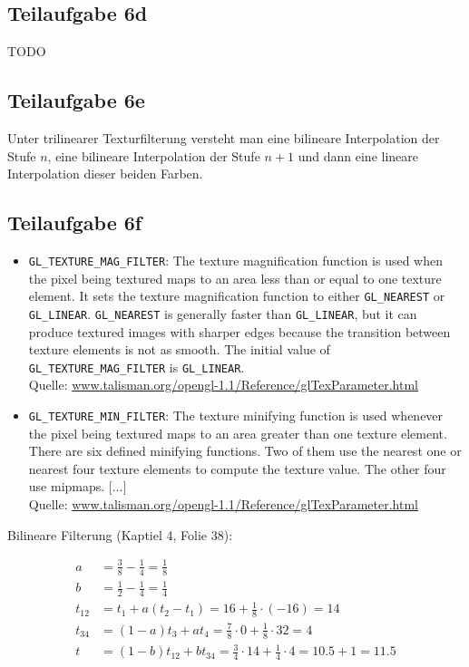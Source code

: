 \documentclass[a4paper]{scrartcl}
\begin{document}
\subsection*{Teilaufgabe 6d}
TODO

\subsection*{Teilaufgabe 6e}
Unter trilinearer Texturfilterung versteht man eine bilineare Interpolation
der Stufe $n$, eine bilineare Interpolation der Stufe $n+1$ und dann eine
lineare Interpolation dieser beiden Farben.

\subsection*{Teilaufgabe 6f}
\begin{itemize}
    \item \texttt{GL\_TEXTURE\_MAG\_FILTER}: The texture magnification function
    is used when the pixel being textured maps to an area less than or equal to
    one texture element. It sets the texture magnification function to either
    \texttt{GL\_NEAREST} or \texttt{GL\_LINEAR}. \texttt{GL\_NEAREST} is
    generally faster than
    \texttt{GL\_LINEAR}, but it can produce textured images with sharper edges
    because the transition between texture elements is not as smooth. The
    initial value of \texttt{GL\_TEXTURE\_MAG\_FILTER} is \texttt{GL\_LINEAR}.\\
    Quelle: \href{https://www.talisman.org/opengl-1.1/Reference/glTexParameter.html}{www.talisman.org/opengl-1.1/Reference/glTexParameter.html}
    \item \texttt{GL\_TEXTURE\_MIN\_FILTER}: The texture minifying function is used whenever the pixel being textured maps to an area greater than one texture element. There are six defined minifying functions. Two of them use the nearest one or nearest four texture elements to compute the texture value. The other four use mipmaps. [...]\\
    Quelle: \href{https://www.talisman.org/opengl-1.1/Reference/glTexParameter.html}{www.talisman.org/opengl-1.1/Reference/glTexParameter.html}
\end{itemize}

Bilineare Filterung (Kaptiel 4, Folie 38):

\begin{align}
    a &= \frac{3}{8} - \frac{1}{4} = \frac{1}{8}\\
    b &= \frac{1}{2} - \frac{1}{4} = \frac{1}{4}\\
    t_{12} &= t_1 + a(t_2 - t_1) = 16 + \frac{1}{8} \cdot (-16) = 14\\
    t_{34} &= (1-a) t_3 + a t_4 = \frac{7}{8} \cdot 0 + \frac{1}{8} \cdot 32 = 4\\
    t &= (1-b) t_{12} + b t_{34} = \frac{3}{4} \cdot 14 + \frac{1}{4} \cdot 4 = 10.5 + 1 = 11.5
\end{align}
\end{document}
